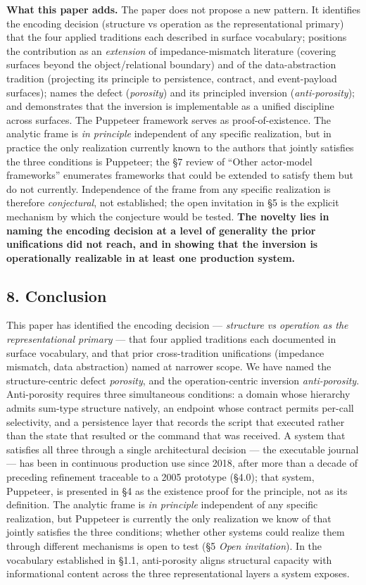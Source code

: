 \documentclass[
]{article}
\begin{document}
\textbf{What this paper adds.} The paper does not propose a new pattern.
It identifies the encoding decision (structure vs operation as the
representational primary) that the four applied traditions each
described in surface vocabulary; positions the contribution as an
\emph{extension} of impedance-mismatch literature (covering surfaces
beyond the object/relational boundary) and of the data-abstraction
tradition (projecting its principle to persistence, contract, and
event-payload surfaces); names the defect (\emph{porosity}) and its
principled inversion (\emph{anti-porosity}); and demonstrates that the
inversion is implementable as a unified discipline across surfaces. The
Puppeteer framework serves as proof-of-existence. The analytic frame is
\emph{in principle} independent of any specific realization, but in
practice the only realization currently known to the authors that
jointly satisfies the three conditions is Puppeteer; the §7 review of
``Other actor-model frameworks'' enumerates frameworks that could be
extended to satisfy them but do not currently. Independence of the frame
from any specific realization is therefore \emph{conjectural}, not
established; the open invitation in §5 is the explicit mechanism by
which the conjecture would be tested. \textbf{The novelty lies in naming
the encoding decision at a level of generality the prior unifications
did not reach, and in showing that the inversion is operationally
realizable in at least one production system.}

\subsection{8. Conclusion}\label{conclusion}

This paper has identified the encoding decision --- \emph{structure vs
operation as the representational primary} --- that four applied
traditions each documented in surface vocabulary, and that prior
cross-tradition unifications (impedance mismatch, data abstraction)
named at narrower scope. We have named the structure-centric defect
\emph{porosity}, and the operation-centric inversion
\emph{anti-porosity}. Anti-porosity requires three simultaneous
conditions: a domain whose hierarchy admits sum-type structure natively,
an endpoint whose contract permits per-call selectivity, and a
persistence layer that records the script that executed rather than the
state that resulted or the command that was received. A system that
satisfies all three through a single architectural decision --- the
executable journal --- has been in continuous production use since 2018,
after more than a decade of preceding refinement traceable to a 2005
prototype (§4.0); that system, Puppeteer, is presented in §4 as the
existence proof for the principle, not as its definition. The analytic
frame is \emph{in principle} independent of any specific realization,
but Puppeteer is currently the only realization we know of that jointly
satisfies the three conditions; whether other systems could realize them
through different mechanisms is open to test (§5 \emph{Open
invitation}). In the vocabulary established in §1.1, anti-porosity
aligns structural capacity with informational content across the three
representational layers a system exposes.
\end{document}
